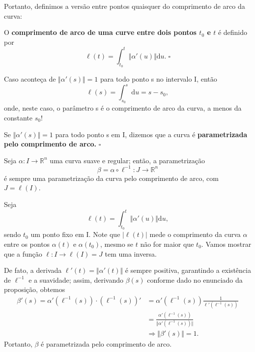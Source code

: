 \documentclass[../differential_geometry.tex]{subfiles}
\begin{document}
Portanto, definimos a versão entre pontos quaisquer do comprimento de arco da curva:
\begin{def*}
	O \textbf{comprimento de arco de uma curve entre dois pontos \(t_{0}\) e \(t\)} é definido por
	\[
		\ell (t) = \int_{t_{0}}^{t}\Vert \alpha '(u) \Vert \mathrm{d}u.\; \square
	\]
\end{def*}
\begin{tcolorbox}[
		skin=enhanced,
		title=Observação,
		fonttitle=\bfseries,
		colframe=black,
		colbacktitle=cyan!75!white,
		colback=cyan!15,
		colbacklower=black,
		coltitle=black,
		drop fuzzy shadow,
	]
	Caso aconteça de \(\Vert \alpha '(s) \Vert=1\) para todo ponto s no intervalo I, então
	\[
		\ell (s)=\int_{s_{0}}^{s} \mathrm{d}u = s-s_{0},
	\]
	onde, neste caso, o parâmetro s é o comprimento de arco da curva, a menos da constante \(s_{0}!\)
\end{tcolorbox}
\begin{def*}
	Se \(\Vert \alpha '(s) \Vert=1\) para todo ponto s em I, dizemos que a curva é \textbf{parametrizada pelo comprimento de arco.} \(\square\)
\end{def*}
\begin{prop*}
	Seja \(\alpha :I\rightarrow \mathbb{R}^{n}\) uma curva suave e regular; então, a parametrização
	\[
		\beta = \alpha \circ \ell^{-1}:J\rightarrow \mathbb{R}^{n}
	\]
	é sempre uma parametrização da curva pelo comprimento de arco, com \(J = \ell (I).\)
\end{prop*}
\begin{proof*}
	Seja
	\[
		\ell (t) = \int_{t_{0}}^{t}\Vert \alpha'(u) \Vert \mathrm{d}u,
	\]
	sendo \(t_{0}\) um ponto fixo em I.
	Note que \(| \ell (t) |\) mede o comprimento da curva \(\alpha \) entre os pontos \(\alpha (t)\) e \(\alpha (t_{0})\), mesmo se \(t\) não for maior que \(t_{0}\).
	Vamos mostrar que a função \(\ell :I\rightarrow \ell (I)=J\) tem uma inversa.

	De fato, a derivada \(\ell '(t) = \Vert \alpha '(t) \Vert \) é sempre positiva, garantindo a existência de \(\ell ^{-1}\) e a suavidade; assim, derivando \(\beta (s)\) conforme dado no enunciado da proposição, obtemos
	\begin{align*}
		\beta '(s) = \alpha '(\ell^{-1}(s)) \cdot (\ell^{-1}(s))' & = \alpha '(\ell ^{-1}(s))\frac{1}{\ell'(\ell^{-1}(s))}              \\
		                                                          & = \frac{\alpha'(\ell^{-1}(s))}{\Vert \alpha '(\ell ^{-1}(s)) \Vert} \\
		                                                          & \Rightarrow \Vert \beta '(s) \Vert =1.
	\end{align*}
	Portanto, \(\beta \) é parametrizada pelo comprimento de arco. \qedsymbol
\end{proof*}
\end{document}
